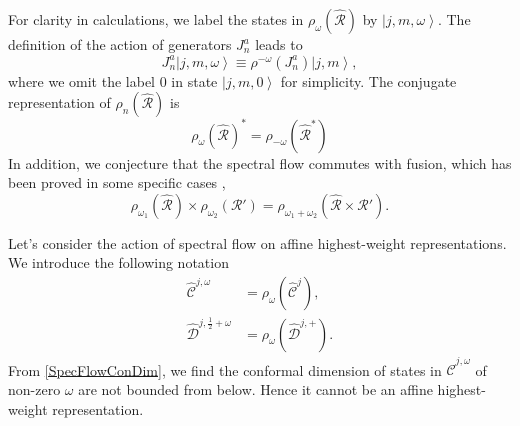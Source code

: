 \documentclass[10pt,a4paper]{article}
\numberwithin{equation}{section}
\newcommand{\ket}[1]{\left| #1 \right\rangle}
\begin{document}
For clarity in calculations, we label the states in $\rho_{\omega}\left(\hat{\mathcal{R}}\right)$ by $\ket{j,m,\omega}$. The definition 
of the action of generators $J^{a}_{n}$ leads to
\begin{equation}
    J^{a}_{n} \ket{j,m,\omega} \equiv \rho^{-\omega} \left(J^{a}_{n}\right) \ket{j,m},
\end{equation}
where we omit the label $0$ in state $\ket{j,m,0}$ for simplicity. 
The conjugate representation of $\rho_{n} \left(\hat{\mathcal{R}} \right)$ is 
\begin{equation}
    \rho_{\omega} \left( \hat{\mathcal{R}} \right)^{*} = \rho_{-\omega} \left(\hat{\mathcal{R}}^{*} \right)
\end{equation}
In addition, we conjecture that the spectral flow commutes with fusion, which has been proved in some specific cases \cite{Gaberdiel:2001ny}, 
\begin{equation}
    \rho_{\omega_{1}} \left(\hat{\mathcal{R}}\right) \times \rho_{\omega_{2}} \left(\mathcal{R'}\right) = \rho_{\omega_{1} + \omega_{2}} \left(\hat{\mathcal{R}}\times \mathcal{R'}\right). \label{SpecFus}
\end{equation}

Let's consider the action of spectral flow on affine highest-weight representations. We introduce the following notation 
\begin{equation}
    \begin{aligned}
        \hat{\mathcal{C}}^{j,\omega} &= \rho_{\omega} \left( \hat{\mathcal{C}}^{j} \right),\\
        \hat{\mathcal{D}}^{j, \frac{1}{2} + \omega} &= \rho_{\omega} \left( \hat{\mathcal{D}}^{j, +} \right).
    \end{aligned} \label{SpecFlowNotation}
\end{equation}
From \eqref{SpecFlowConDim}, we find the conformal dimension of states in $\hat{\mathcal{C}}^{j,\omega}$ of non-zero $\omega$ are not bounded 
from below. Hence it cannot be an affine highest-weight representation.
\end{document}

